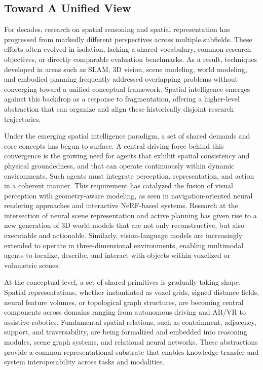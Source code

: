 \subsection{Toward A Unified View}
\label{subsec:p1-sec2-toward-a-unified-view}

For decades, research on spatial reasoning and spatial representation has progressed from markedly different perspectives across multiple subfields.
These efforts often evolved in isolation, lacking a shared vocabulary, common research objectives, or directly comparable evaluation benchmarks.
As a result, techniques developed in areas such as SLAM, 3D vision, scene modeling, world modeling, and embodied planning frequently addressed overlapping problems without converging toward a unified conceptual framework.
Spatial intelligence emerges against this backdrop as a response to fragmentation, offering a higher-level abstraction that can organize and align these historically disjoint research trajectories.



Under the emerging spatial intelligence paradigm, a set of shared demands and core concepts has begun to surface.
A central driving force behind this convergence is the growing need for agents that exhibit spatial consistency and physical groundedness, and that can operate continuously within dynamic environments.
Such agents must integrate perception, representation, and action in a coherent manner.
This requirement has catalyzed the fusion of visual perception with geometry-aware modeling, as seen in navigation-oriented neural rendering approaches and interactive NeRF-based systems.
Research at the intersection of neural scene representation and active planning has given rise to a new generation of 3D world models that are not only reconstructive, but also executable and actionable.
Similarly, vision-language models are increasingly extended to operate in three-dimensional environments, enabling multimodal agents to localize, describe, and interact with objects within voxelized or volumetric scenes.



At the conceptual level, a set of shared primitives is gradually taking shape.
Spatial representations, whether instantiated as voxel grids, signed distance fields, neural feature volumes, or topological graph structures, are becoming central components across domains ranging from autonomous driving and AR/VR to assistive robotics.
Fundamental spatial relations, such as containment, adjacency, support, and traversability, are being formalized and embedded into reasoning modules, scene graph systems, and relational neural networks.
These abstractions provide a common representational substrate that enables knowledge transfer and system interoperability across tasks and modalities.



